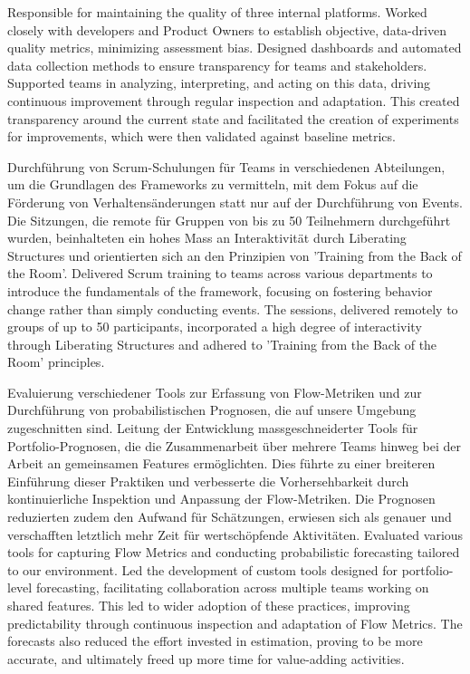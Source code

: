 \begin{cventries}
{\begin{cvitems}
{{				}
				{
					Responsible for maintaining the quality of three internal platforms. Worked closely with developers and Product Owners to establish objective, data-driven quality metrics, minimizing assessment bias. Designed dashboards and automated data collection methods to ensure transparency for teams and stakeholders. Supported teams in analyzing, interpreting, and acting on this data, driving continuous improvement through regular inspection and adaptation. This created transparency around the current state and facilitated the creation of experiments for improvements, which were then validated against baseline metrics.
				}
			}	
			\item {
				{
					Durchführung von Scrum-Schulungen für Teams in verschiedenen Abteilungen, um die Grundlagen des Frameworks zu vermitteln, mit dem Fokus auf die Förderung von Verhaltensänderungen statt nur auf der Durchführung von Events. Die Sitzungen, die remote für Gruppen von bis zu 50 Teilnehmern durchgeführt wurden, beinhalteten ein hohes Mass an Interaktivität durch Liberating Structures und orientierten sich an den Prinzipien von 'Training from the Back of the Room'.
				}
				{
					Delivered Scrum training to teams across various departments to introduce the fundamentals of the framework, focusing on fostering behavior change rather than simply conducting events. The sessions, delivered remotely to groups of up to 50 participants, incorporated a high degree of interactivity through Liberating Structures and adhered to 'Training from the Back of the Room' principles.
				}
			}	
			\item {
				{
					Evaluierung verschiedener Tools zur Erfassung von Flow-Metriken und zur Durchführung von probabilistischen Prognosen, die auf unsere Umgebung zugeschnitten sind. Leitung der Entwicklung massgeschneiderter Tools für Portfolio-Prognosen, die die Zusammenarbeit über mehrere Teams hinweg bei der Arbeit an gemeinsamen Features ermöglichten. Dies führte zu einer breiteren Einführung dieser Praktiken und verbesserte die Vorhersehbarkeit durch kontinuierliche Inspektion und Anpassung der Flow-Metriken. Die Prognosen reduzierten zudem den Aufwand für Schätzungen, erwiesen sich als genauer und verschafften letztlich mehr Zeit für wertschöpfende Aktivitäten.
				}
				{
					Evaluated various tools for capturing Flow Metrics and conducting probabilistic forecasting tailored to our environment. Led the development of custom tools designed for portfolio-level forecasting, facilitating collaboration across multiple teams working on shared features. This led to wider adoption of these practices, improving predictability through continuous inspection and adaptation of Flow Metrics. The forecasts also reduced the effort invested in estimation, proving to be more accurate, and ultimately freed up more time for value-adding activities.
				}
			}			
		\end{cvitems}
	}	
	

\end{cventries}
